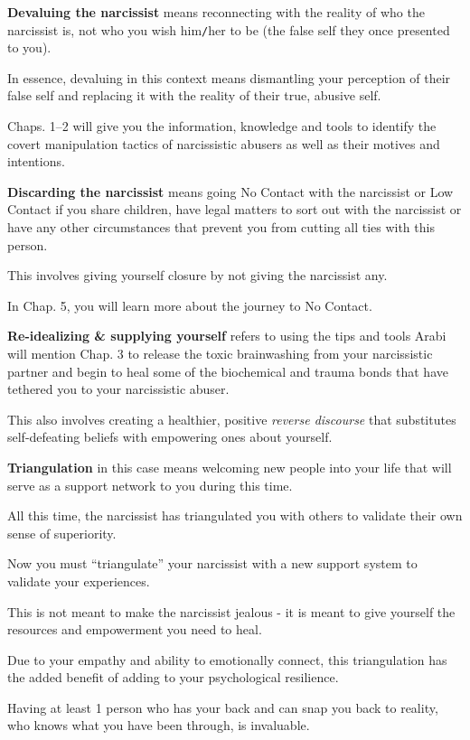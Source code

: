 \documentclass[oneside]{book}
\numberwithin{equation}{section}
\begin{document}
%
\textbf{Devaluing the narcissist} means reconnecting with the reality of who the narcissist is, not who you wish him\texttt{/}her to be (the false self they once presented to you).

In essence, devaluing in this context means dismantling your perception of their false self and replacing it with the reality of their true, abusive self.

%
Chaps. 1--2 will give you the information, knowledge and tools to identify the covert manipulation tactics of narcissistic abusers as well as their motives and intentions.

%
\textbf{Discarding the narcissist} means going No Contact with the narcissist or Low Contact if you share children, have legal matters to sort out with the narcissist or have any other circumstances that prevent you from cutting all ties with this person.

This involves giving yourself closure by not giving the narcissist any.

In Chap. 5, you will learn more about the journey to No Contact.

%
\textbf{Re-idealizing \& supplying yourself} refers to using the tips and tools Arabi will mention Chap. 3 to release the toxic brainwashing from your narcissistic partner and begin to heal some of the biochemical and trauma bonds that have tethered you to your narcissistic abuser.

This also involves creating a healthier, positive \textit{reverse discourse} that substitutes self-defeating beliefs with empowering ones about yourself.

%
\textbf{Triangulation} in this case means welcoming new people into your life that will serve as a support network to you during this time.

All this time, the narcissist has triangulated you with others to validate their own sense of superiority.

Now you must ``triangulate'' your narcissist with a new support system to validate your experiences.

This is not meant to make the narcissist jealous - it is meant to give yourself the resources and empowerment you need to heal.

%
Due to your empathy and ability to emotionally connect, this triangulation has the added benefit of adding to your psychological resilience.

Having at least 1 person who has your back and can snap you back to reality, who knows what you have been through, is invaluable.
\end{document}

